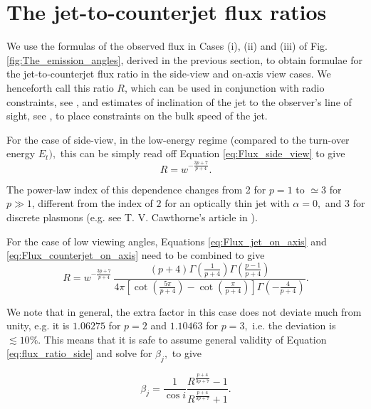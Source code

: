 \section{The jet-to-counterjet flux ratios} \label{sec:jet-to-counterjet_ratio}

We use the formulas of the observed flux in Cases (i), (ii) and (iii) of Fig. \ref{fig:The_emission_angles}, derived in the previous section, to obtain formulae for the jet-to-counterjet flux ratio in the side-view and on-axis view cases. We henceforth call this ratio $ R $, which can be used in conjunction with radio constraints, see \citealt{Stirling_et_al.-2001-MNRAS}, and estimates of inclination of the jet to the observer's line of sight, see \citealt{Orosz_et_al.-2011-ApJ}, to place constraints on the bulk speed of the jet.

For the case of side-view, in the low-energy regime (compared to the turn-over energy $ E_t  ), $ this can be simply read off Equation \ref{eq:Flux_side_view} to give
\begin{equation}
R = w^{-\frac{3p+7}{p+4}}. \label{eq:flux_ratio_side}
\end{equation}

The power-law index of this dependence changes from 2 for $ p = 1 $ to $ \simeq 3 $ for $ p \gg 1 $, different from the index of $ 2 $ for an optically thin jet with $ \alpha = 0 , $ and $ 3 $ for discrete plasmons (e.g. see T. V. Cawthorne's article in \citealt{Beams_and_jets}).

For the case of low viewing angles, Equations \ref{eq:Flux_jet_on_axis} and \ref{eq:Flux_counterjet_on_axis} need to be combined to give
\begin{equation}
R = w^{-\frac{3p+7}{p+4}} \, \frac{(p+4) \Gamma \left(\frac{1}{p+4}\right) \Gamma \left(\frac{p-1}{p+4}\right)}{4 \pi  \left[\cot \left(\frac{5 \pi }{p+4}\right)-\cot \left(\frac{\pi }{p+4}\right)\right] \Gamma \left(-\frac{4}{p+4}\right)} . \label{eq:flux_ratio_on-axis}
\end{equation}

We note that in general, the extra factor in this case does not deviate much from unity, e.g. it is $1.06275$ for $ p = 2 $ and $ 1.10463 $ for $ p = 3 , $ i.e. the deviation is $ \lesssim 10 \% . $ This means that it is safe to assume general validity of Equation \ref{eq:flux_ratio_side} and solve for $ \beta_j, $ to give

\begin{equation}
\beta_j=\frac{1}{\cos i} \dfrac{ R^\frac{p+4}{3p+7} - 1 }{ R^\frac{p+4}{3p+7} + 1 }.
\label{eq:beta}
\end{equation}




